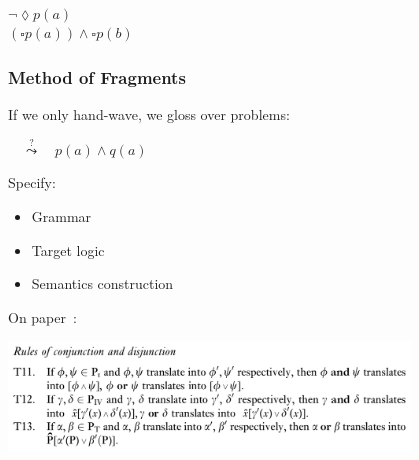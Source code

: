 \begin{frame}
{        \begin{minipage}[t][2cm]{0.6\textwidth}\vspace{1em}
            \\[0.5em]
        \end{minipage}\hfill
        \begin{minipage}[t][2cm]{0.39\textwidth}\vspace{1em}
            $\neg\lozenge p(a)$\\[0.5em]
            $(\square p(a)) \wedge \square p(b)$
        \end{minipage}
    }
\end{frame}

\begin{frame}
    \frametitle{Method of Fragments}
    If we only hand-wave, we gloss over problems:

    \hspace{2em}
    $\quad\stackrel{?}{\leadsto}\quad p(a)\wedge q(a)$

    \vspace{1.5em}
    Specify:
    \begin{itemize}
        \item Grammar
        \item Target logic
        \item Semantics construction
    \end{itemize}

    \vspace{1.5em}
    On paper~\cite{Montague:tptoqi73}:

    \vspace{0.3em}\hspace{2em}\includegraphics[trim=0 0 0 80,clip,width=0.8\textwidth]{fig/montague-tptoqioe.png}
\end{frame}
